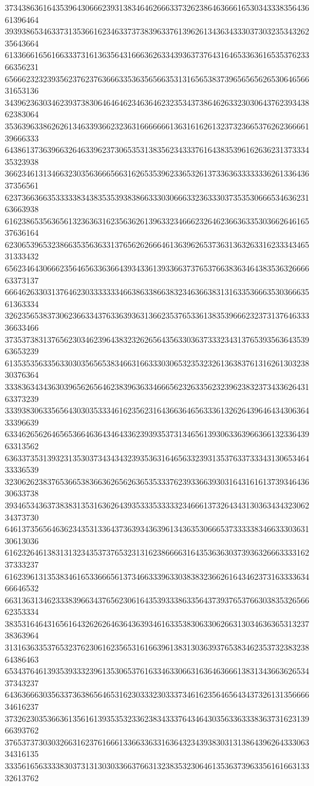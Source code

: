 37343863616435396430666239313834646266633732623864636661653034333835643661396464
39393865346337313536616234633737383963376139626134363433303730323534326235643664
61336661656166333731613635643166636263343936373764316465336361653537623366356231
65666232323935623762376366633536356566353131656538373965656562653064656631653136
34396236303462393738306464646234636462323534373864626332303064376239343862383064
35363963386262613463393662323631666666613631616261323732366537626236666139666333
64386137363966326463396237306535313835623433376164383539616263623137333435323938
36623461313466323035636665663162653539623365326137336363333333626133643637356561
62373663663533333834383535393838663330306663323633303735353066653463623163663938
61623865356365613236363162356362613963323466623264623663633530366264616537636164
62306539653238663535636331376562626664613639626537363136326331623334346531333432
65623464306662356465633636643934336139336637376537663836346438353632666663373137
66646263303137646230333333346638633866383234636638313163353666353036663561363334
32623565383730623663343763363936313662353765336138353966623237313764633336633466
37353738313765623034623964383232626564356330363733323431376539356364353963653239
61353535633563303035656538346631663330306532353232613638376131626130323830376364
33383634343630396562656462383963633466656232633562323962383237343362643163373239
33393830633565643030353334616235623164366364656333613262643964643430636433396639
63346265626465653664636434643362393935373134656139306336396636613233643963313562
63633735313932313530373434343239353631646563323931353763373334313065346433336539
32306262383765366538366362656263653533376239336639303164316161373934643630633738
39346534363738383135316362643935333533333234666137326434313036343432306234373730
64613735656463623435313364373639343639613436353066653733333834663330363130613036
61623264613831313234353737653231316238666631643536363037393632666333316237333237
61623961313538346165336665613734663339633038383236626164346237316333363466646532
66313631346233383966343765623061643539333863356437393765376630383532656662353334
38353164643165616432626264636436393461633538306330626631303463636531323738363964
31316363353765323762306162356531616639613831303639376538346235373238323864386463
65343764613935393332396135306537616334633066316364636661383134366362653437343237
64363666303563373638656465316230333230333734616235646564343732613135666634616237
37326230353663613561613935353233623834333764346430356336333836373162313966393762
37653737303032663162376166613366336331636432343938303131386439626433306334316135
33356165633338303731313030336637663132383532306461353637396335616166313332613762
